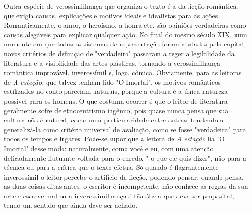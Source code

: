 Outra espécie de verossimilhança que organiza o texto é a da ficção
romântica, que exigia causas, explicações e motivos ideais e idealistas
para as ações. Romanticamente, o amor, o heroísmo, a honra etc. são
opiniões verdadeiras como causas alegáveis para explicar qualquer ação.
No final do mesmo século XIX, num momento em que todos os sistemas de
representação foram abalados pelo capital, novos critérios de definição
de "verdadeiro" passaram a reger a legibilidade da literatura e a
visibilidade das artes plásticas, tornando a verossimilhança romântica
improvável, inverossímil e, logo, cômica. Obviamente, para as leitoras
de \emph{A estação,} que talvez tenham lido "O Imortal", os motivos
românticos estilizados no conto pareciam naturais, porque a cultura é a
única natureza possível para os homens. O que costuma ocorrer é que o
leitor de literatura geralmente sofre de etnocentrismo ingênuo, pois
quase nunca pensa que sua cultura não é natural, como uma
particularidade entre outras, tendendo a generalizá-la como critério
universal de avaliação, como se fosse "verdadeira" para todos os tempos
e lugares. Pode-se supor que a leitora de \emph{A estação} lia "O
Imortal" desse modo: naturalmente, como você e eu, com uma atenção
delicadamente flutuante voltada para o enredo, " o que ele quis dizer",
não para a técnica ou para a crítica que o texto efetua. Só quando é
flagrantemente inverossímil o leitor percebe o artifício da ficção,
podendo pensar, quando pensa, as duas coisas ditas antes: o escritor é
incompetente, não conhece as regras da sua arte e escreve mal ou a
inverossimilhança é tão óbvia que deve ser proposital, tendo um sentido
que ainda deve ser achado.

